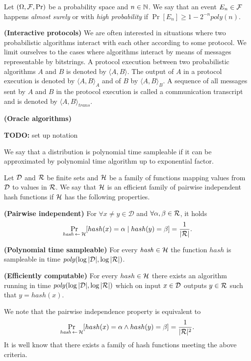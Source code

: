 Let $(\Omega, \mathcal{F}, \Pr)$ be a probability space and $n \in \mathbb{N}$. We say that an event $E_n \in \mathcal{F}$
happens \textit{almost surely} or with \textit{high probability} if $\Pr[E_n] \geq 1 - 2^{-n} \mathit{poly}(n)$.

\textbf{(Interactive protocols)} We are often interested in situations where two probabilistic algorithms interact with each other according to some protocol.
We limit ourselves to the cases where algorithms interact by means of messages representable by bitstrings.
A protocol execution between two probabilistic algorithms $A$ and $B$ is denoted by $\langle A, B \rangle$.
The output of $A$ in a protocol execution is denoted by $\langle A, B \rangle_A$ and of $B$ by $\langle A, B \rangle_B$.
A sequence of all messages sent by $A$ and $B$ in the protocol execution is called a communication transcript and
is denoted by $\langle A, B \rangle_{\mathit{trans}}$.

\textbf{(Oracle algorithms)}
\begin{todo}
  \textbf{TODO:} set up notation
\end{todo}

\begin{definition}
We say that a distribution is polynomial time sampleable if it can be approximated by polynomial time algorithm
up to exponential factor.
\end{definition}

\begin{definition}
Let $\mathcal{D}$ and $\mathcal{R}$ be finite sets and $\mathcal{H}$ be a family of functions mapping values from $\mathcal{D}$ to values in $\mathcal{R}$.
We say that $\mathcal{H}$ is an \textnormal{efficient family of pairwise independent hash functions}
if $\mathcal{H}$ has the following properties.

\textbf{(Pairwise independent)} For $\forall x \neq y \in \mathcal{D}$ and $\forall \alpha, \beta \in \mathcal{R}$, it holds
\begin{displaymath}
\underset{\hash \la0 \cH}{\Pr}[hash(x) = \alpha \mid hash(y) = \beta] = \frac{1}{|\cR|}.
\end{displaymath}

\textbf{(Polynomial time sampleable)} For every $\mathit{hash} \in \mathcal{H}$ the function $\mathit{hash}$ is sampleable in time $\mathit{poly}(\log|\mathcal{D}|, \log|\mathcal{R}|)$.

\textbf{(Efficiently computable)}
For every $hash \in \mathcal{H}$ there exists an algorithm running in time $\mathit{poly}(\log|\mathcal{D}|, \log|\mathcal{R}|)$ which
on input $x \in \mathcal{D}$ outputs $y \in \mathcal{R}$ such that $y = hash(x)$.
\end{definition}

We note that the pairwise independence property is equivalent to
\begin{displaymath}
\underset{\hash \la0 \cH}{\Pr}[hash(x) = \alpha \land hash(y) = \beta] = \frac{1}{|\cR|^2}.
\end{displaymath}
It is well know \cite{Carter:1977:UCH:800105.803400} that there exists a family of hash functions meeting the above criteria.

